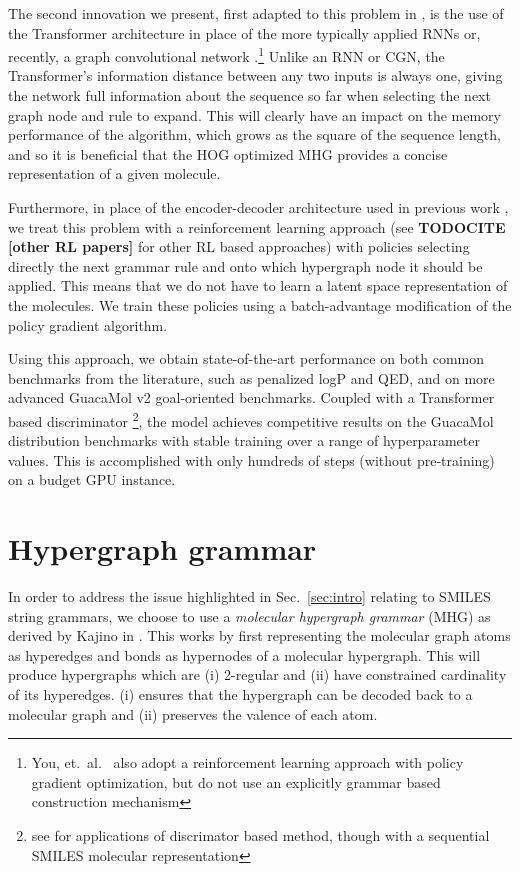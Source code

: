 \documentclass{article}
\newcommand{\CITE}[1]{{\bf TODOCITE [#1]}}
\begin{document}
The second innovation we present, first adapted to this problem in \cite{kraev2018}, is the use of the Transformer architecture \cite{vaswani2017} in place of the more typically applied RNNs \cite{yang2017, olivecrona2017} or, recently, a graph convolutional network \cite{you2018}.\footnote{You, et.~al.~\cite{you2018} also adopt a reinforcement learning approach with policy gradient optimization, but do not use an explicitly grammar based construction mechanism} Unlike an RNN or CGN, the Transformer's information distance between any two inputs is always one, giving the network full information about the sequence so far when selecting the next graph node and rule to expand. This will clearly have an impact on the memory performance of the algorithm, which grows as the square of the sequence length, and so it is beneficial that the HOG optimized MHG provides a concise representation of a given molecule.

Furthermore, in place of the encoder-decoder architecture used in previous work \cite{dai2018, jin2018, simonovsky2018, kusner2017, gomezbombarelli2016}, we treat this problem with a reinforcement learning approach (see \cite{popova2018} \CITE{other RL papers} for other RL based approaches) with policies selecting directly the next grammar rule and onto which hypergraph node it should be applied. This means that we do not have to learn a latent space representation of the molecules. We train these policies using a batch-advantage modification of the policy gradient algorithm.

Using this approach, we obtain state-of-the-art performance on both common benchmarks from the literature, such as penalized logP and QED, and on more advanced GuacaMol v2 goal-oriented benchmarks. Coupled with a Transformer based discriminator \footnote{see \cite{guimaraes2017, sanchezlengeling2017, putin2018} for applications of discrimator based method, though with a sequential SMILES molecular representation}, the model achieves competitive results on the GuacaMol distribution benchmarks with stable training over a range of hyperparameter values. This is accomplished with only hundreds of steps (without pre-training) on a budget GPU instance.

\section{Hypergraph grammar}\label{sec:grammar}
In order to address the issue highlighted in Sec.~\ref{sec:intro} relating to SMILES string grammars, we choose to use a {\em molecular hypergraph grammar} (MHG) as derived by Kajino in \cite{kajino2018}. This works by first representing the molecular graph atoms as hyperedges and bonds as hypernodes of a molecular hypergraph. This will produce hypergraphs which are (i) 2-regular and (ii) have constrained cardinality of its hyperedges. (i) ensures that the hypergraph can be decoded back to a molecular graph and (ii) preserves the valence of each atom.
\end{document}
